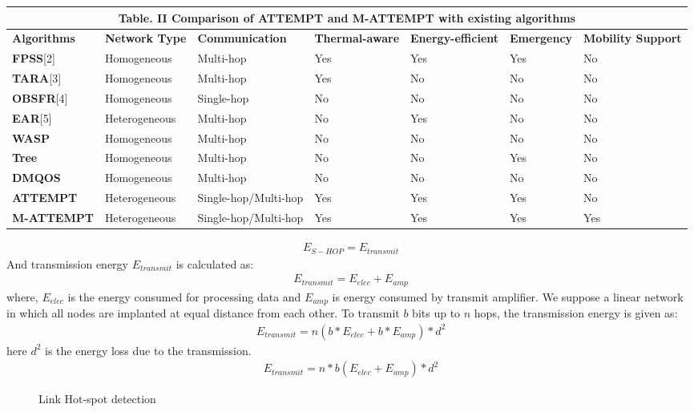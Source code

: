 \documentclass[journal]{IEEEtran}
\begin{document}
\begin{table*}[ht]
 \centering
\begin{tabular}{| p{1.8cm} || p{1.8cm} || p{2.5cm} || p{1.8cm} || p{2cm} || p{1.8cm}|| p{1.8cm}|}
  \multicolumn{7}{c}{Table. II Comparison of ATTEMPT and M-ATTEMPT with existing algorithms}\\
  \hline
  \textbf{Algorithms}&\textbf{Network Type }&\textbf{Communication}&\textbf{Thermal-aware}&\textbf{Energy-efficient}&\textbf{Emergency}&\textbf{Mobility Support}  \\ \hline \hline
   \textbf{FPSS}[2] 	& Homogeneous   &   Multi-hop    &  Yes     & Yes   & Yes  & No    \\ \hline
   \textbf{TARA}[3]	    & Homogeneous   &   Multi-hop	 &  Yes     & No    & No   & No   \\ \hline
   \textbf{OBSFR}[4] 	& Homogeneous   &   Single-hop   &  No      & No    & No   & No   \\ \hline
   \textbf{EAR}[5]      & Heterogeneous & Multi-hop      &  No      & Yes   & No   & No   \\ \hline
   \textbf{WASP}\cite{6}	& Homogeneous   &    Multi-hop	 &  No      & No    & No   & No    \\ \hline
   \textbf{Tree} \cite{7}	& Homogeneous   &   Multi-hop	 &  No      & No    & Yes  & No     \\ \hline
   \textbf{DMQOS}\cite{razzaque2011data} 	& Homogeneous   &    Multi-hop	 &  No        & No  & No   & No      \\ \hline
   \textbf{ATTEMPT}	    & Heterogeneous & Single-hop/Multi-hop & Yes  & Yes & Yes  & No     \\ \hline
   \textbf{M-ATTEMPT}	    & Heterogeneous & Single-hop/Multi-hop & Yes  & Yes & Yes  & Yes     \\ \hline
\end{tabular}
\end{table*}

\begin{eqnarray}
E_{S-HOP}=E_{transmit}
\end{eqnarray}
And transmission energy $ E_{transmit}$ is calculated as:
\begin{eqnarray}
E_{transmit}= E_{elec}+ E_{amp}
\end{eqnarray}
where, $E_{elec}$ is the energy consumed for processing data and $E_{amp}$ is energy consumed by transmit amplifier. We suppose a linear network in which all nodes are implanted at equal distance from each other. To transmit $b$ bits up to $n$ hops, the transmission energy is given as:
\begin{eqnarray}
E_{transmit}= n(b*E_{elec}+ b*E_{amp})* d^{2}
\end{eqnarray}
here $d^{2}$ is the energy loss due to the transmission.
\begin{eqnarray}
E_{transmit}= n*b(E_{elec}+ E_{amp})* d^{2}
\end{eqnarray}
\begin{figure*}[ht]
  \centering
  \caption{Link Hot-spot detection}\label{fig3}
\end{figure*}
\end{document}
